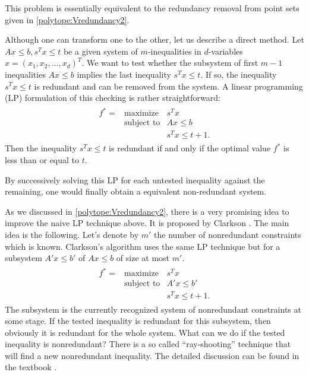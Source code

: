 \documentclass[a4paper,12pt]{article}
\begin{document}
This problem is essentially equivalent to the redundancy
removal from point sets given in \ref{polytope:Vredundancy2}.

Although one can transform one to the other, let us describe
a direct method.  Let $A x \le b, s^T x \le t$ be a given system of $m$-inequalities in $d$-variables $x=(x_1,x_2,\ldots,x_d)^T$.
We want to test whether the subsystem of first $m-1$ inequalities $A x \le b$ 
implies the last inequality $s^T x \le t$.  If so,
the inequality $s^T x \le t$ is redundant 
and can be removed from the system.
  A linear programming (LP)
formulation of this checking is rather straightforward:
\begin{align} \label{eq:Hredundancy_lp1}
\begin{array}{lll}
f^* = &\text{maximize}    & s^T x\\
&\text{subject to}  & A x \le b
\\  
&                   & s^T x  \le  t+1.
\end{array}
\end{align}
Then the inequality $s^T x \le t$ is redundant if and only if
the optimal value $f^*$ is less than or equal to $t$.

By successively solving this LP for each untested inequality 
against the remaining,
one would finally obtain a equivalent non-redundant system. 

As we discussed in \ref{polytope:Vredundancy2}, there is
a very promising idea to improve the naive LP technique above.
It is proposed by Clarkson  \cite{c-mosga-94} .
The main idea is the following.  Let's denote by $m'$ the number of 
nonredundant constraints which is known.  Clarkson's algorithm uses
the same LP technique but for a subsystem $A' x \le b'$ of $A x \le b$
of size at most $m'$.
\begin{align} \label{eq:Hredundancy_Clarkson}
\begin{array}{lll}
f^* = &\text{maximize}    & s^T x\\
&\text{subject to}  & A' x \le b'
\\  
&                   & s^T x  \le  t+1.
\end{array}
\end{align}
The subsystem is the currently recognized system of  nonredundant
constraints at some stage.  If the tested inequality is redundant for
this subsystem, then obviously it is redundant for the whole system.
What can we do if the tested inequality is nonredundant?   There is
a so called ``ray-shooting'' technique that will find a new nonredundant
inequality.  The detailed discussion can be found in the textbook \cite[Chap 7]{f-pc-20}.
\end{document}
